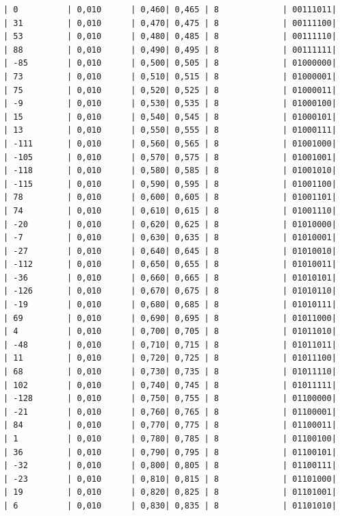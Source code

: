 \documentclass[a4paper,14pt]{extarticle}
\begin{document}
\begin{enumerate}
\begin{verbatim}
| 0          | 0,010      | 0,460| 0,465 | 8             | 00111011|
| 31         | 0,010      | 0,470| 0,475 | 8             | 00111100|
| 53         | 0,010      | 0,480| 0,485 | 8             | 00111110|
| 88         | 0,010      | 0,490| 0,495 | 8             | 00111111|
| -85        | 0,010      | 0,500| 0,505 | 8             | 01000000|
| 73         | 0,010      | 0,510| 0,515 | 8             | 01000001|
| 75         | 0,010      | 0,520| 0,525 | 8             | 01000011|
| -9         | 0,010      | 0,530| 0,535 | 8             | 01000100|
| 15         | 0,010      | 0,540| 0,545 | 8             | 01000101|
| 13         | 0,010      | 0,550| 0,555 | 8             | 01000111|
| -111       | 0,010      | 0,560| 0,565 | 8             | 01001000|
| -105       | 0,010      | 0,570| 0,575 | 8             | 01001001|
| -118       | 0,010      | 0,580| 0,585 | 8             | 01001010|
| -115       | 0,010      | 0,590| 0,595 | 8             | 01001100|
| 78         | 0,010      | 0,600| 0,605 | 8             | 01001101|
| 74         | 0,010      | 0,610| 0,615 | 8             | 01001110|
| -20        | 0,010      | 0,620| 0,625 | 8             | 01010000|
| -7         | 0,010      | 0,630| 0,635 | 8             | 01010001|
| -27        | 0,010      | 0,640| 0,645 | 8             | 01010010|
| -112       | 0,010      | 0,650| 0,655 | 8             | 01010011|
| -36        | 0,010      | 0,660| 0,665 | 8             | 01010101|
| -126       | 0,010      | 0,670| 0,675 | 8             | 01010110|
| -19        | 0,010      | 0,680| 0,685 | 8             | 01010111|
| 69         | 0,010      | 0,690| 0,695 | 8             | 01011000|
| 4          | 0,010      | 0,700| 0,705 | 8             | 01011010|
| -48        | 0,010      | 0,710| 0,715 | 8             | 01011011|
| 11         | 0,010      | 0,720| 0,725 | 8             | 01011100|
| 68         | 0,010      | 0,730| 0,735 | 8             | 01011110|
| 102        | 0,010      | 0,740| 0,745 | 8             | 01011111|
| -128       | 0,010      | 0,750| 0,755 | 8             | 01100000|
| -21        | 0,010      | 0,760| 0,765 | 8             | 01100001|
| 84         | 0,010      | 0,770| 0,775 | 8             | 01100011|
| 1          | 0,010      | 0,780| 0,785 | 8             | 01100100|
| 36         | 0,010      | 0,790| 0,795 | 8             | 01100101|
| -32        | 0,010      | 0,800| 0,805 | 8             | 01100111|
| -23        | 0,010      | 0,810| 0,815 | 8             | 01101000|
| 19         | 0,010      | 0,820| 0,825 | 8             | 01101001|
| 6          | 0,010      | 0,830| 0,835 | 8             | 01101010|

\end{verbatim}
\end{enumerate}
\end{document}
